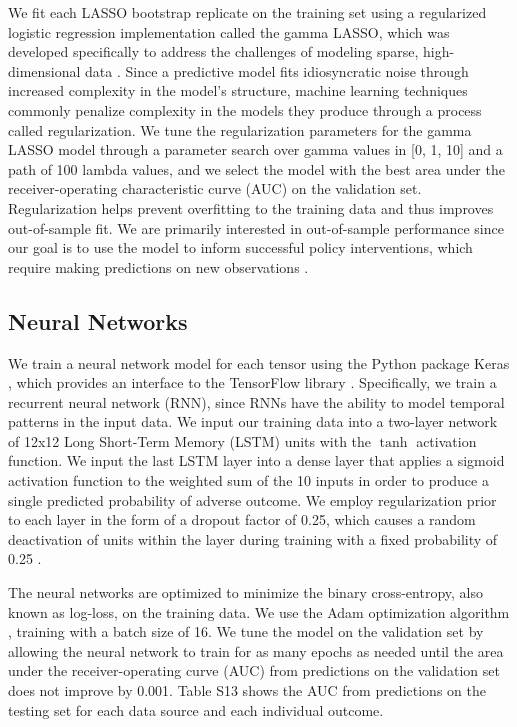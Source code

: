 \documentclass[9pt,twoside]{pnas-new}
\begin{document}
We fit each LASSO bootstrap replicate on the training set using a regularized logistic regression implementation called the gamma LASSO, which was developed specifically to address the challenges of modeling sparse, high-dimensional data \cite{taddy}. Since a predictive model fits idiosyncratic noise through increased complexity in the model's structure, machine learning techniques commonly penalize complexity in the models they produce through a process called regularization. We tune the regularization parameters for the gamma LASSO model through a parameter search over gamma values in [0, 1, 10] and a path of 100 lambda values, and we select the model with the best area under the receiver-operating characteristic curve (AUC) on the validation set. Regularization helps prevent overfitting to the training data and thus improves out-of-sample fit. We are primarily interested in out-of-sample performance since our goal is to use the model to inform successful policy interventions, which require making predictions on new observations \cite{kleinberg}.

\subsection{Neural Networks}

We train a neural network model for each tensor using the Python package Keras \cite{chollet}, which provides an interface to the TensorFlow library \cite{abadi}. Specifically, we train a recurrent neural network (RNN), since RNNs have the ability to model temporal patterns in the input data. We input our training data into a two-layer network of 12x12 Long Short-Term Memory (LSTM) \cite{hochreiter} units with the $\tanh$ activation function. We input the last LSTM layer into a dense layer that applies a sigmoid activation function to the weighted sum of the 10 inputs in order to produce a single predicted probability of adverse outcome. We employ regularization prior to each layer in the form of a dropout factor of 0.25, which causes a random deactivation of units within the layer during training with a fixed probability of 0.25 \cite{srivastava}.

The neural networks are optimized to minimize the binary cross-entropy, also known as log-loss, on the training data. We use the Adam optimization algorithm \cite{kingma}, training with a batch size of 16. We tune the model on the validation set by allowing the neural network to train for as many epochs as needed until the area under the receiver-operating curve (AUC) from predictions on the validation set does not improve by 0.001. Table S13 shows the AUC from predictions on the testing set for each data source and each individual outcome.
\end{document}

